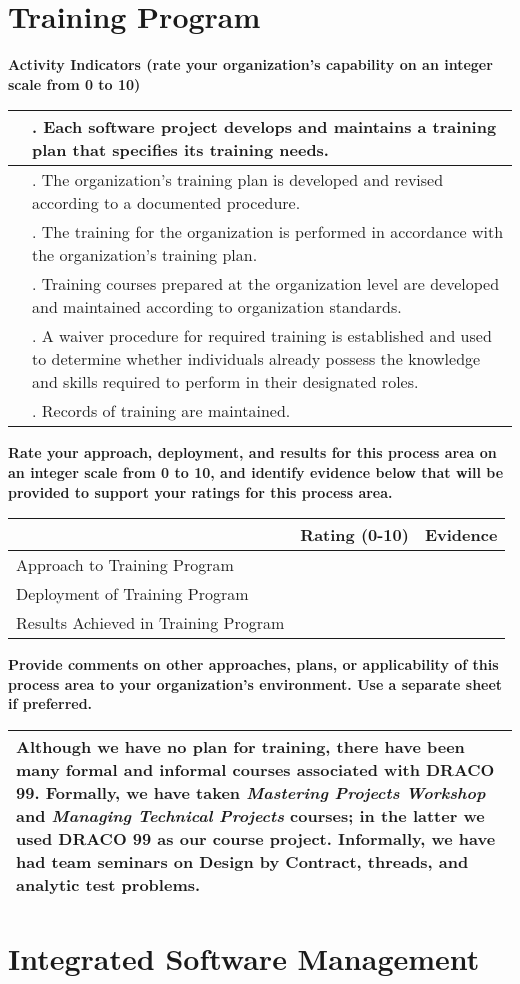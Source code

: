 \documentclass{article}
\newcommand{\KPAname}{}
\let\KPAsection=\section
\renewcommand{\section}[1]{\renewcommand{\KPAname}{#1}\KPAsection{#1}}
\newcounter{activity}[section]		%
\newcounter{approach}[section]
\newcounter{deployment}[section]
\newcounter{result}[section]
\newcounter{score}
\newenvironment{KPAActivity}
{
    {\bf Activity Indicators (rate your organization's capability
    on an integer scale from 0 to 10)} %
    \begin{center}
    \begin{tabular}{|p{0.5in}|p{6.0in}|} \hline %
}
{
    \end{tabular}
    \end{center}
    \setcounter{approach}{\value{approach}/\value{activity}}
    \setcounter{deployment}{\value{deployment}/\value{activity}}
    \setcounter{result}{\value{result}/\value{activity}}
}
\newcommand{\Activity}[4]
{
    \stepcounter{activity} 
    \setcounter{score}{(#1+#2+#3)/3}
    \setcounter{approach}{\value{approach}+#1}
    \setcounter{deployment}{\value{deployment}+#1}
    \setcounter{result}{\value{result}+#1}
    \arabic{score} & \arabic{activity}. #4 \\ \hline
} %
\newenvironment{KPARate}
{
    {\bf Rate your approach, deployment, and results for
    this process area on an integer scale from 0 to 10, and 
    identify evidence below that will be provided to support your
    ratings for this process area.}
    \begin{center}
    \begin{tabular}{|p{1.0in}|p{0.5in}|p{5.0in}|} \hline
    & Rating (0-10) & \multicolumn{1}{c|}{Evidence} \\ \hline
}
{
    \end{tabular}
    \end{center}
}
\newcommand{\Approach}[1]
{
    Approach to \KPAname & \arabic{approach} & #1 \\ \hline
}
\newcommand{\Deployment}[1]
{
    Deployment of \KPAname & \arabic{deployment} & #1 \\ \hline
}
\newcommand{\Results}[1]
{
    Results Achieved in \KPAname & \arabic{result} & #1 \\ \hline
}
\newenvironment{KPAComment}
{
    {\bf Provide comments on other approaches, plans,
    or applicability of this process area to your organization's
    environment.  Use a separate sheet if preferred.}
    \begin{center}
    \begin{tabular}{|p{6.50in}|} \hline
}
{
    \\ \hline
    \end{tabular}
    \end{center}
}
\begin{document}
\newpage
\section{Training Program}

\begin{KPAActivity}
\Activity{0}{0}{0}{Each software project develops and maintains a training
plan that specifies its training needs.}
\Activity{0}{0}{0}{The organization's training plan is developed and
revised according to a documented procedure.}
\Activity{0}{0}{0}{The training for the organization is performed in
accordance with the organization's training plan.}
\Activity{0}{0}{0}{Training courses prepared at the organization level are
developed and maintained according to organization standards.}
\Activity{0}{0}{0}{A waiver procedure for required training is established
and used to determine whether individuals already possess the
knowledge and skills required to perform in their designated roles.}
\Activity{0}{0}{0}{Records of training are maintained.}
\end{KPAActivity}

\begin{KPARate}
\Approach{}
\Deployment{}
\Results{}
\end{KPARate}

\begin{KPAComment}
Although we have no plan for training, there have been many formal and
informal courses associated with DRACO 99.  Formally, we have taken
{\em Mastering Projects Workshop} and {\em Managing Technical
Projects} courses; in the latter we used DRACO 99 as our course
project.  Informally, we have had team seminars on Design by Contract,
threads, and analytic test problems.
\end{KPAComment}
\newpage
\section{Integrated Software Management}
\end{document}
